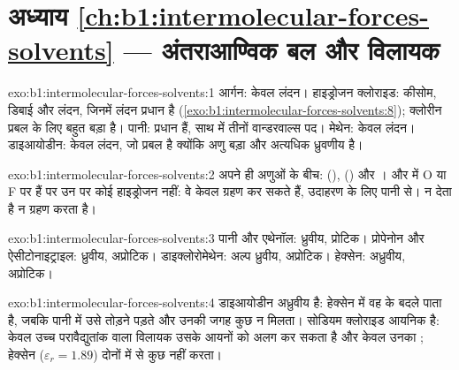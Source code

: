 \section*{अध्याय \ref{ch:b1:intermolecular-forces-solvents} --- अंतराआण्विक बल और विलायक}

\begin{solution}{exo:b1:intermolecular-forces-solvents:1}
आर्गन: केवल लंदन। हाइड्रोजन क्लोराइड: कीसोम, डिबाई और लंदन, जिनमें लंदन
प्रधान है (\cref{exo:b1:intermolecular-forces-solvents:8}); क्लोरीन
प्रबल  के लिए बहुत बड़ा है। पानी:  प्रधान हैं, साथ में
तीनों वान्डरवाल्स पद। मेथेन: केवल लंदन। डाइआयोडीन: केवल लंदन,
जो प्रबल है क्योंकि अणु बड़ा और अत्यधिक ध्रुवणीय है।
\end{solution}

\begin{solution}{exo:b1:intermolecular-forces-solvents:2}
अपने ही अणुओं के बीच:  (), 
() और ।  और  में O
या F पर  हैं पर उन पर कोई हाइड्रोजन नहीं: वे केवल  ग्रहण कर सकते हैं,
उदाहरण के लिए पानी से।  न देता है न ग्रहण करता है।
\end{solution}

\begin{solution}{exo:b1:intermolecular-forces-solvents:3}
पानी और एथेनॉल: ध्रुवीय, प्रोटिक। प्रोपेनोन और ऐसीटोनाइट्राइल: ध्रुवीय,
अप्रोटिक। डाइक्लोरोमेथेन: अल्प ध्रुवीय, अप्रोटिक। हेक्सेन: अध्रुवीय, अप्रोटिक।
\end{solution}

\begin{solution}{exo:b1:intermolecular-forces-solvents:4}
डाइआयोडीन अध्रुवीय है: हेक्सेन में वह  के बदले  पाता है, जबकि पानी में उसे  तोड़ने पड़ते और उनकी
जगह कुछ न मिलता। सोडियम क्लोराइड आयनिक है: केवल उच्च
परावैद्युतांक वाला विलायक उसके आयनों को अलग कर सकता है और केवल  उनका ;
हेक्सेन ($\varepsilon_r = 1.89$) दोनों में से कुछ नहीं करता।
\end{solution}


